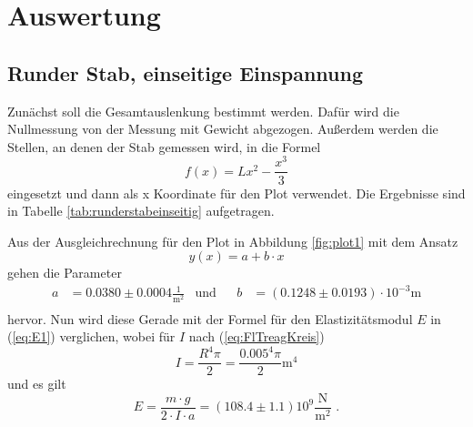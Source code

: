 \section{Auswertung}
\label{sec:Auswertung}

\subsection{Runder Stab, einseitige Einspannung}
Zunächst soll die Gesamtauslenkung bestimmt werden.
Dafür wird die Nullmessung von der Messung mit Gewicht abgezogen.
Außerdem werden die Stellen, an denen der Stab gemessen wird, in die Formel 
\begin{equation}
  f(x) = Lx^2 - \frac{x^3}{3}
\end{equation}
eingesetzt und dann als x Koordinate für den Plot verwendet.
Die Ergebnisse sind in Tabelle \ref{tab:runderstabeinseitig} aufgetragen.

Aus der Ausgleichrechnung für den Plot in Abbildung \ref{fig:plot1} mit dem Ansatz
\begin{equation*}
  y(x) = a + b \cdot x
\end{equation*}
gehen die Parameter
\begin{align*}
  a &= 0.0380 ± 0.0004 \frac{1}{\unit{\meter\squared}} & \text{und}& & b&= (0.1248 ± 0.0193) \cdot 10^{-3} \unit\meter\\
\end{align*}
hervor. Nun wird diese Gerade mit der Formel für den Elastizitätsmodul $E$ in (\ref{eq:E1}) verglichen, wobei für $I$ nach (\ref{eq:FlTreagKreis})
\begin{equation*}
  I = \frac{R^4 \pi}{2} = \frac{0.005^4 \pi}{2} \unit{\meter}^4
\end{equation*}
und es gilt
\begin{equation*}
  E = \frac{m \cdot g} {2 \cdot I \cdot a} = (108.4 \pm 1.1) 10^9 \frac{\unit\newton}{\unit\meter^2} \text{ .}
\end{equation*}



